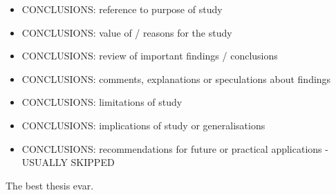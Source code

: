 
\begin{itemize}
\item CONCLUSIONS: reference to purpose of study
\item CONCLUSIONS: value of / reasons for the study
\item CONCLUSIONS: review of important findings / conclusions
\item CONCLUSIONS: comments, explanations or speculations about findings
\item CONCLUSIONS: limitations of study
\item CONCLUSIONS: implications of study or generalisations
\item CONCLUSIONS: recommendations for future or practical applications - USUALLY SKIPPED
\end{itemize}

The best thesis evar.
